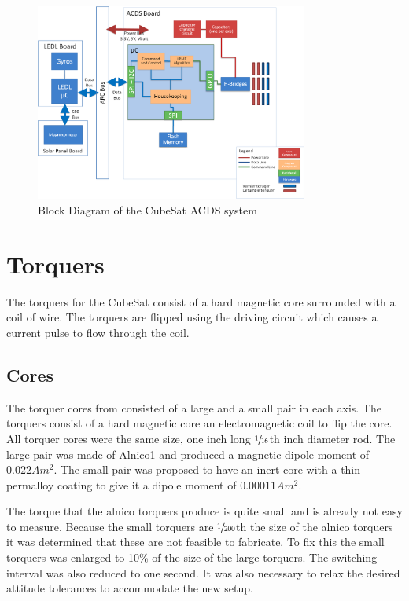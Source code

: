 \begin{figure}[H]
    \centering
    \includegraphics[width=0.8\textwidth]{Figures/Block}
    \caption{Block Diagram of the CubeSat \acs{ACDS} system}
\end{figure}


\section{Torquers}

The torquers for the CubeSat consist of a hard magnetic core surrounded with a coil of wire. The torquers are flipped using the driving circuit which causes a current pulse to flow through the coil.

\subsection{Cores}

The torquer cores from \cite{Mentch11} consisted of a large and a small pair in each axis. The torquers consist of a hard magnetic core an electromagnetic coil to flip the core. All torquer cores were the same size, one inch long $\sfrac{1}{16}$th inch diameter rod. The large pair was made of Alnico1 and produced a magnetic dipole moment of $0.022 \unit{A m^2}$. The small pair was proposed to have an inert core with a thin permalloy coating to give it a dipole moment of $0.00011 \unit{A m^2}$.

The torque that the alnico torquers produce is quite small and is already not easy to measure. Because the small torquers are $\sfrac{1}{200}$th the size of the alnico torquers it was determined that these are not feasible to fabricate. To fix this the small torquers was enlarged to 10\% of the size of the large torquers. The switching interval was also reduced to one second. It was also necessary to relax the desired attitude tolerances to accommodate the new setup.

